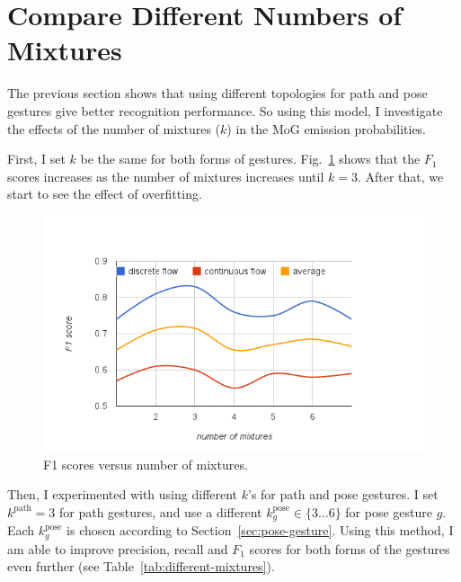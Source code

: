 \section{Compare Different Numbers of Mixtures}
The previous section shows that using different topologies for path and pose
gestures give better
recognition performance. So using this model, I investigate the effects
of the number of mixtures ($k$) in the MoG emission probabilities.

First, I set $k$ be the same for both forms of gestures.
Fig.~\ref{fig:mixtures} shows that the $F_1$ scores increases as the number of
mixtures increases until $k=3$.
After that, we start to see the effect of overfitting.

\begin{figure}[tbh]
\centering
\includegraphics[trim=10mm 5mm 10mm 15mm,
clip, width=\columnwidth]{figures/f1_nM.png}
\caption{F1 scores versus number of mixtures.}
\label{fig:mixtures}
\end{figure}

Then, I experimented with using different $k$'s for path and pose gestures. I
set $k^\text{path} = 3$ for path gestures, and use a different
$k^{\text{pose}}_g\in \{3\ldots6\}$ for pose gesture $g$. Each
$k^{\text{pose}}_g$ is chosen according to Section~\ref{sec:pose-gesture}.
Using this method, I am able to improve precision, recall and $F_1$ scores for
both forms of the gestures even further (see
Table~\ref{tab:different-mixtures}).


